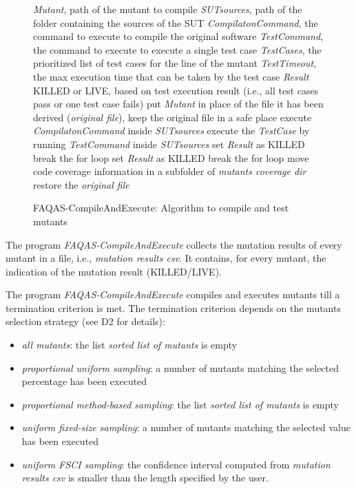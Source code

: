 \begin{figure}[h]
\begin{algorithmic}[1]
\scriptsize
\Require \emph{Mutant}, path of the mutant to compile
\Require \emph{SUTsources}, path of the folder containing the sources of the SUT
\Require \emph{CompilatonCommand}, the command to execute to compile the original software
\Require \emph{TestCommand}, the command to execute to execute a single test case
\Require \emph{TestCases}, the prioritized list of test cases for the line of the mutant
\Require \emph{TestTimeout}, the max execution time that can be taken by the test case
\Ensure \emph{Result} KILLED or LIVE, based on test execution result (i.e., all test cases pass or one test case fails)
\State put \emph{Mutant} in place of the file it has been derived (\emph{original file}), keep the original file in a safe place
\State execute  \emph{CompilatonCommand} inside \emph{SUTsources}
\State execute the \emph{TestCase} by running \emph{TestCommand} inside \emph{SUTsources}
\State set \emph{Result} as KILLED
\State break the for loop
\EndIf
{}
\State set \emph{Result} as KILLED
\State break the for loop
\EndIf
\EndFor
\State move code coverage information in a subfolder of \emph{mutants coverage dir}
\State restore the \emph{original file}
\end{algorithmic}
\caption{FAQAS-CompileAndExecute: Algorithm to compile and test mutants}
\label{alg:compileAndExecute}
\end{figure}

The program \emph{FAQAS-CompileAndExecute} collects the mutation results of every mutant in a file, i.e., \emph{mutation results csv}. It contains, for every mutant, the indication of the mutation result (KILLED/LIVE).

The program \emph{FAQAS-CompileAndExecute} compiles and executes mutants till a termination criterion is met. The termination criterion depends on the mutants selection strategy (see D2 for details):
\begin{itemize}
\item \emph{all mutants}: the list \emph{sorted list of mutants} is empty
\item \emph{proportional uniform sampling}: a number of mutants matching the selected percentage has been executed
\item \emph{proportional method-based sampling}: the list \emph{sorted list of mutants} is empty
\item \emph{uniform fixed-size sampling}: a number of mutants matching the selected value has been executed
\item \emph{uniform FSCI sampling}: the confidence interval computed from \emph{mutation results csv} is smaller than the length specified by the user.
\end{itemize}

